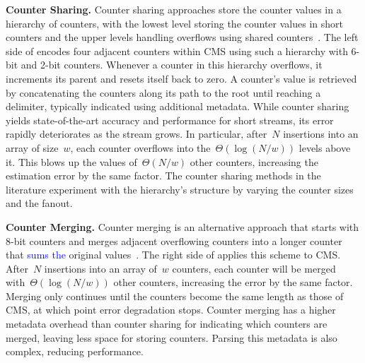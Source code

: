 \documentclass[sigconf]{acmart}
\begin{document}
\textbf{Counter Sharing.}
Counter sharing approaches store the counter values in a hierarchy of counters,
with the lowest level storing the counter values in short counters and the
upper levels handling overflows using shared
counters~\cite{BitSense,PyramidSketch,StingySketch,AdaptiveCounterSplicing,CounterTree,TreeSensing,TailoredSketch}.
The left side of  encodes four adjacent
counters within CMS using such a hierarchy with 6{\nobreakdash-}bit and
2{\nobreakdash-}bit counters. Whenever a counter in this hierarchy overflows,
it increments its parent and resets itself back to zero. A counter's value is
retrieved by concatenating the counters along its path to the root until
reaching a delimiter, typically indicated using additional metadata. While
counter sharing yields state-of-the-art accuracy and performance for short
streams, its error rapidly deteriorates as the stream grows. In particular,
after~$N$ insertions into an array of size~$w$, each counter overflows into
the~$\Theta(\log (N/w))$ levels above it. This blows up the values
of~$\Theta(N/w)$ other counters, increasing the estimation error by the same
factor. The counter sharing methods in the literature experiment with the
hierarchy’s structure by varying the counter sizes and the fanout.

\textbf{Counter Merging.}
Counter merging is an alternative approach that starts with 8-bit counters and
merges adjacent overflowing counters into a longer counter that
\textcolor{blue}{sums the} original values~\cite{SALSA}. The right side of
applies this scheme to CMS. After~$N$ insertions into an array of~$w$ counters,
each counter will be merged with~$\Theta(\log (N/w))$ other counters,
increasing the error by the same factor. Merging only continues until the
counters become the same length as those of CMS, at which point error
degradation stops. Counter merging has a higher metadata overhead than counter
sharing for indicating which counters are merged, leaving less space for
storing counters. Parsing this metadata is also complex, reducing performance.
\end{document}
